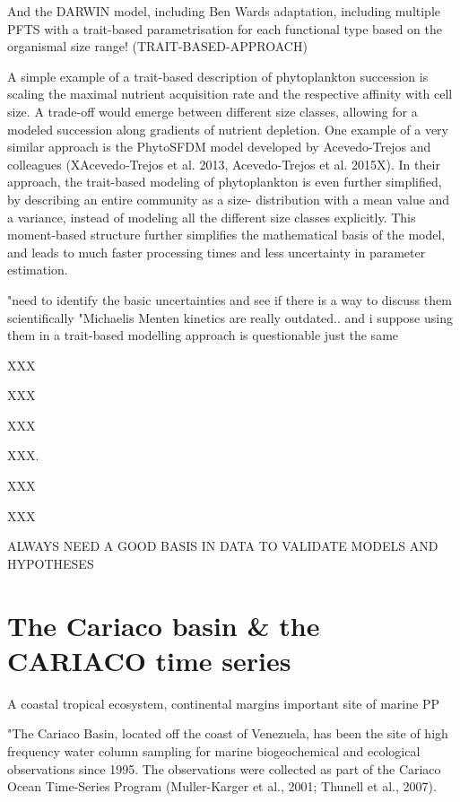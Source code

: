 And the DARWIN model, including Ben Wards adaptation, including multiple PFTS with a trait-based parametrisation for each functional type based on the organismal size range! (TRAIT-BASED-APPROACH)


A simple example of a trait-based description of phytoplankton succession is scaling the maximal nutrient acquisition rate and the respective affinity with cell size. A trade-off would emerge between different size classes, allowing for a modeled succession along gradients of nutrient depletion. One example of a very similar approach is the PhytoSFDM model developed by Acevedo-Trejos and colleagues (XAcevedo‐Trejos et al. 2013, Acevedo-Trejos et al. 2015X). In their approach, the trait-based modeling of phytoplankton is even further simplified, by describing an entire community as a size- distribution with a mean value and a variance, instead of modeling all the different size classes explicitly. This moment-based structure further simplifies the mathematical basis of the model, and leads to much faster processing times and less uncertainty in parameter estimation.



"need to identify the basic uncertainties and see if there is a way to discuss them scientifically
"Michaelis Menten kinetics are really outdated.. and i suppose using them in a trait-based modelling approach is questionable just the same





XXX

XXX

XXX

XXX. 

XXX

XXX

ALWAYS NEED A GOOD BASIS IN DATA TO VALIDATE MODELS AND HYPOTHESES

\section{The Cariaco basin \& the CARIACO time series}

A coastal tropical ecosystem, continental margins important site of marine PP


"The Cariaco Basin, located off the coast of Venezuela, has been the site of high frequency water column sampling for marine biogeochemical and ecological observations since 1995. The observations were collected as part of the Cariaco Ocean Time-Series Program (Muller-Karger et al., 2001; Thunell et al., 2007). 

